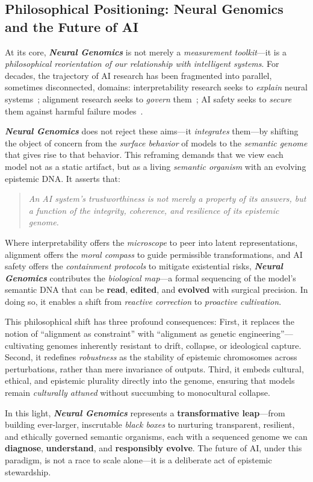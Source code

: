 \subsection*{\textbf{Philosophical Positioning: Neural Genomics and the Future of AI}}

At its core, \textbf{\emph{Neural Genomics}} is not merely a \emph{measurement toolkit}—it is a \emph{philosophical reorientation of our relationship with intelligent systems}. For decades, the trajectory of AI research has been fragmented into parallel, sometimes disconnected, domains: interpretability research seeks to \emph{explain} neural systems~\cite{olah2020zoom, christiano2021deep}; alignment research seeks to \emph{govern} them~\cite{askell2021general, bai2022training}; AI safety seeks to \emph{secure} them against harmful failure modes~\cite{hendrycks2021unsolved, amodei2016concrete}. 

\textbf{\emph{Neural Genomics}} does not reject these aims—it \emph{integrates} them—by shifting the object of concern from the \emph{surface behavior} of models to the \emph{semantic genome} that gives rise to that behavior. This reframing demands that we view each model not as a static artifact, but as a living \emph{semantic organism} with an evolving epistemic DNA. It asserts that:
\begin{quote}
\emph{An AI system’s trustworthiness is not merely a property of its answers, but a function of the integrity, coherence, and resilience of its epistemic genome.}
\end{quote}

Where interpretability offers the \emph{microscope} to peer into latent representations, alignment offers the \emph{moral compass} to guide permissible transformations, and AI safety offers the \emph{containment protocols} to mitigate existential risks, \textbf{\emph{Neural Genomics}} contributes the \emph{biological map}—a formal sequencing of the model’s semantic DNA that can be \textbf{read}, \textbf{edited}, and \textbf{evolved} with surgical precision. In doing so, it enables a shift from \emph{reactive correction} to \emph{proactive cultivation}.

This philosophical shift has three profound consequences: First, it replaces the notion of “alignment as constraint” with “alignment as genetic engineering”—cultivating genomes inherently resistant to drift, collapse, or ideological capture. Second, it redefines \emph{robustness} as the stability of epistemic chromosomes across perturbations, rather than mere invariance of outputs. Third, it embeds cultural, ethical, and epistemic plurality directly into the genome, ensuring that models remain \emph{culturally attuned} without succumbing to monocultural collapse.

In this light, \textbf{\emph{Neural Genomics}} represents a \textbf{transformative leap}—from building ever-larger, inscrutable \emph{black boxes} to nurturing transparent, resilient, and ethically governed semantic organisms, each with a sequenced genome we can \textbf{diagnose}, \textbf{understand}, and \textbf{responsibly evolve}. The future of AI, under this paradigm, is not a race to scale alone—it is a deliberate act of epistemic stewardship.

